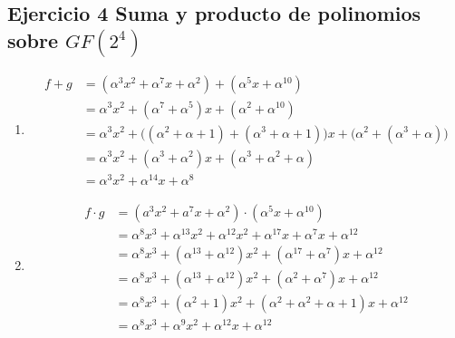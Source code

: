 \documentclass[11pt,fleqn]{article}
\begin{document}
\subsection*{Ejercicio 4 Suma y producto de polinomios sobre $GF(2^4)$}
\begin{enumerate}[label=\alph*)]
\item {}
\begin{align*}
f+g
&=(\alpha^3x^2+\alpha^7x+\alpha^2)+(\alpha^5x+\alpha^{10})\\
&=\alpha^3x^2+(\alpha^7+\alpha^5)x+(\alpha^2+\alpha^{10})\\
&=\alpha^3x^2+\bigl((\alpha^2+\alpha+1)+(\alpha^3+\alpha+1)\bigr)x+\bigl(\alpha^2+(\alpha^3+\alpha)\bigr)\\
&=\alpha^3x^2+(\alpha^3+\alpha^2)x+(\alpha^3+\alpha^2+\alpha)\\
&=\alpha^3x^2+\alpha^{14}x+\alpha^8
\end{align*}

\item {}
\begin{align*}
f\cdot g
&=(a^3x^2+a^7x+\alpha^2)\cdot(\alpha^5x+\alpha^{10})\\
&=\alpha^8x^3+\alpha^{13}x^2+\alpha^{12}x^2+\alpha^{17}x+\alpha^7x+\alpha^{12}\\
&=\alpha^8x^3+(\alpha^{13}+\alpha^{12})x^2+(\alpha^{17}+\alpha^7)x+\alpha^{12}\\
&=\alpha^8x^3+(\alpha^{13}+\alpha^{12})x^2+(\alpha^{2}+\alpha^7)x+\alpha^{12}\\
&=\alpha^8x^3+(\alpha^2+1)x^2+(\alpha^2+\alpha^2+\alpha+1)x+\alpha^{12}\\
&=\alpha^8x^3+\alpha^9x^2+\alpha^{12}x+\alpha^{12}
\end{align*}

\end{enumerate}
\end{document}
